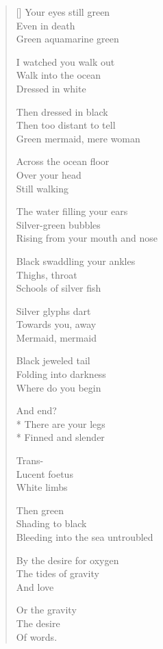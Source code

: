 \label{ch:lastsilences}
\settowidth{\versewidth}{Bleeding into the sea untroubled}
\begin{verse}[\versewidth]
Your eyes still green\\
Even in death\\
Green \quad aquamarine \quad green

I watched you walk out\\
Walk into the ocean\\
Dressed in white

Then dressed in black\\
Then too distant to tell\\
Green mermaid, mere woman

Across the ocean floor\\
Over your head\\
Still walking

The water filling your ears\\
Silver-green bubbles\\
Rising from your mouth and nose

Black swaddling your ankles\\
Thighs, throat\\
Schools of silver fish

Silver glyphs dart\\
Towards you, away\\
Mermaid, mermaid

Black jeweled tail\\
Folding into darkness\\
Where do you begin

And end?\\*
There are your legs\\*
Finned and slender

Trans-\\
Lucent  foetus\\
White limbs

Then green\\
Shading to black\\
Bleeding into the sea untroubled

By the desire for oxygen\\
The tides of gravity\\
And love

Or the gravity\\
The desire\\
Of words.  
\end{verse}
